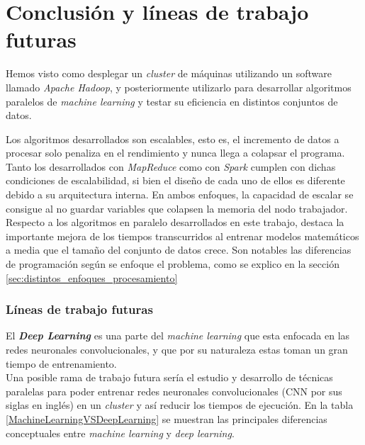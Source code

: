 \chapter*{Conclusión y líneas de trabajo futuras}
Hemos visto como desplegar un \textit{cluster} de máquinas utilizando un software llamado 
\textit{Apache Hadoop}, y posteriormente utilizarlo para desarrollar algoritmos 
paralelos de \textit{machine learning} y testar su eficiencia en distintos conjuntos de datos.


Los algoritmos desarrollados son escalables, esto es, el incremento de datos a procesar solo penaliza en
el rendimiento y nunca llega a colapsar el programa.
Tanto los desarrollados con \textit{MapReduce} como con \textit{Spark} cumplen con dichas condiciones de
escalabilidad, si bien el diseño de cada uno de ellos es diferente debido a su arquitectura interna.
En ambos enfoques, la capacidad de escalar se consigue al no guardar variables que colapsen
la memoria del nodo trabajador.\\
Respecto a los algoritmos en paralelo desarrollados en este trabajo, destaca la importante mejora de los
tiempos transcurridos al entrenar modelos matemáticos a media que el tamaño del conjunto de datos crece.
Son notables las diferencias de programación según se enfoque el problema, como se explico en la sección
\autoref{sec:distintos_enfoques_procesamiento}
\newline

\subsection*{Líneas de trabajo futuras}
El \textbf{\textit{Deep Learning}} es una parte del \textit{machine learning} 
que esta enfocada en las redes neuronales convolucionales, y que por su naturaleza estas toman un gran 
tiempo de entrenamiento.\\
Una posible rama de trabajo futura sería el estudio y desarrollo de técnicas paralelas para poder
entrenar redes neuronales convolucionales (CNN por sus siglas en inglés) en un \textit{cluster} 
y así reducir los tiempos de ejecución.
En la tabla \autoref{MachineLearningVSDeepLearning} se muestran las principales diferencias conceptuales
entre \textit{machine learning} y \textit{deep learning}.

